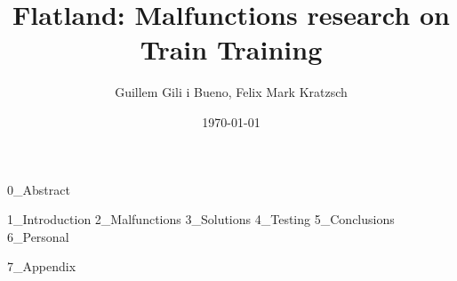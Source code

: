 \documentclass{llncs}
\begin{document}
\title{Flatland: Malfunctions research on Train Training}
\author{Guillem Gili i Bueno, Felix Mark Kratzsch}
\date{\today}
\maketitle

{0_Abstract}

\setcounter{tocdepth}{4}
\tableofcontents

{1_Introduction}
{2_Malfunctions}
{3_Solutions}
{4_Testing}
{5_Conclusions}
{6_Personal}


{}

{7_Appendix}
\end{document}
